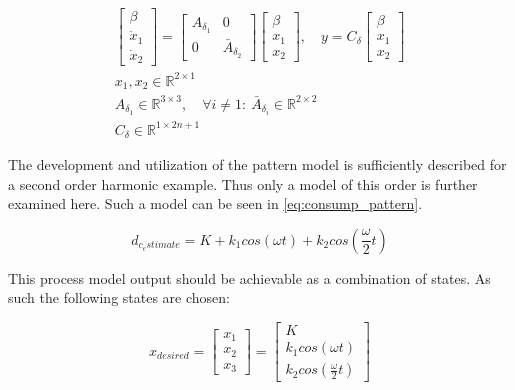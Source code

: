 \begin{equation}\label{eq:DisturbanceVectorCase}
	\begin{gathered}
		\begin{bmatrix} \beta \\ \dot{x}_1 \\ \dot{x}_2 \end{bmatrix} = \begin{bmatrix} A_{\delta_1} & 0 \\ 0 & \bar{A}_{\delta_2} \end{bmatrix} \begin{bmatrix}\beta \\ x_1 \\ x_2 \end{bmatrix},
		\quad y = C_\delta \begin{bmatrix}\beta \\ x_1 \\ x_2 \end{bmatrix} \\
		x_1, x_2 \in \mathbb{R}^{2\times1} \\
		A_{\delta_1} \in \mathbb{R}^{3\times3}, \quad \forall i \neq 1: \ \bar{A}_{\delta_i} \in \mathbb{R}^{2\times2} \\
		C_\delta \in \mathbb{R}^{1\times2n+1}
	\end{gathered}
\end{equation}

The development and utilization of the pattern model is sufficiently described for a second order harmonic example. Thus only a model of this order is further examined here. Such a model can be seen in \cref{eq:consump_pattern}. 

\begin{equation} \label{eq:consump_pattern}
	d_{c_estimate} = K + k_1 cos(\omega t) + k_2 cos(\frac{\omega}{2} t)
\end{equation}

This process model output should be achievable as a combination of states. As such the following states are chosen:

\begin{equation} \label{eq:consump_x}
	x_{desired} =  \begin{bmatrix}
		x_1 \\
		x_2 \\
		x_3
	\end{bmatrix}
	=
	\begin{bmatrix}
		K \\
		k_1 cos(\omega t) \\
		k_2 cos(\frac{\omega}{2} t)
	\end{bmatrix}
\end{equation}

